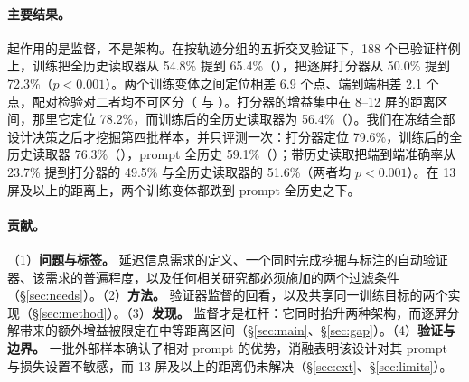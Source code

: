 \paragraph{主要结果。} 起作用的是监督，不是架构。在按轨迹分组的五折交叉验证下，188 个已验证样例上，训练把全历史读取器从 54.8\% 提到 65.4\%（），把逐屏打分器从 50.0\% 提到 72.3\%（$p<0.001$）。两个训练变体之间定位相差 6.9 个点、端到端相差 2.1 个点，配对检验对二者均不可区分（ 与 ）。打分器的增益集中在 8--12 屏的距离区间，那里它定位 78.2\%，而训练后的全历史读取器为 56.4\%（）。我们在冻结全部设计决策之后才挖掘第四批样本，并只评测一次：打分器定位 79.6\%，训练后的全历史读取器 76.3\%（），prompt 全历史 59.1\%（）；带历史读取把端到端准确率从 23.7\% 提到打分器的 49.5\% 与全历史读取器的 51.6\%（两者均 $p<0.001$）。在 13 屏及以上的距离上，两个训练变体都跌到 prompt 全历史之下。

\paragraph{贡献。}（1）\textbf{问题与标签。} 延迟信息需求的定义、一个同时完成挖掘与标注的自动验证器、该需求的普遍程度，以及任何相关研究都必须施加的两个过滤条件（\S\ref{sec:needs}）。（2）\textbf{方法。} 验证器监督的回看，以及共享同一训练目标的两个实现（\S\ref{sec:method}）。（3）\textbf{发现。} 监督才是杠杆：它同时抬升两种架构，而逐屏分解带来的额外增益被限定在中等距离区间（\S\ref{sec:main}、\S\ref{sec:gap}）。（4）\textbf{验证与边界。} 一批外部样本确认了相对 prompt 的优势，消融表明该设计对其 prompt 与损失设置不敏感，而 13 屏及以上的距离仍未解决（\S\ref{sec:ext}、\S\ref{sec:limits}）。
